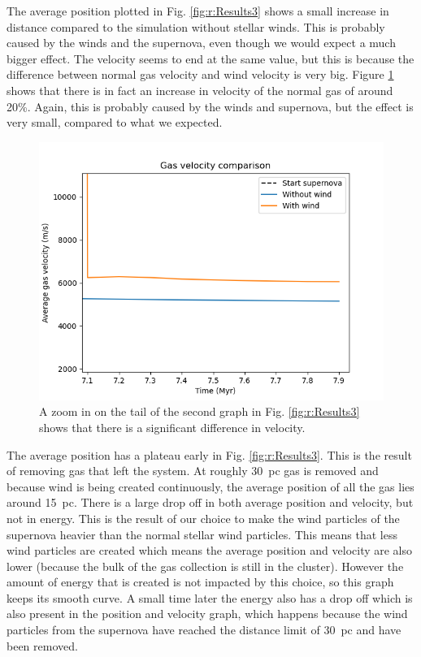 \documentclass[12pt, twocolumn]{article}
\begin{document}
The average position plotted in Fig. \ref{fig:r:Results3} shows a small increase in distance compared to the simulation without stellar winds.
This is probably caused by the winds and the supernova, even though we would expect a much bigger effect.
The velocity seems to end at the same value, but this is because the difference between normal gas velocity and wind velocity is very big.
Figure \ref{fig:r:zoom-in} shows that there is in fact an increase in velocity of the normal gas of around 20\%.
Again, this is probably caused by the winds and supernova, but the effect is very small, compared to what we expected. 

\begin{figure}[h]
   \centering
   \includegraphics[width=0.9\linewidth]{figures/avg_vel3_endzoom.png}
   \caption{A zoom in on the tail of the second graph in Fig. \ref{fig:r:Results3} shows that there is a significant difference in velocity.}
   \label{fig:r:zoom-in}
\end{figure}

The average position has a plateau early in Fig. \ref{fig:r:Results3}.
This is the result of removing gas that left the system.
At roughly \SI{30}{pc} gas is removed and because wind is being created continuously, the average position of all the gas lies around \SI{15}{pc}.
There is a large drop off in both average position and velocity, but not in energy.
This is the result of our choice to make the wind particles of the supernova heavier than the normal stellar wind particles.
This means that less wind particles are created which means the average position and velocity are also lower (because the bulk of the gas collection is still in the cluster).
However the amount of energy that is created is not impacted by this choice, so this graph keeps its smooth curve.
A small time later the energy also has a drop off which is also present in the position and velocity graph, which happens because the wind particles from the supernova have reached the distance limit of \SI{30}{pc} and have been removed.
\end{document}
